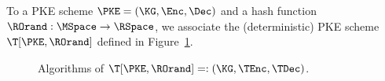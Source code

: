   	\begin{definition}[\T-transform]
  		To a PKE scheme $\PKE = (\KG, \Enc, \Dec)$ and a hash function $\ROrand:\MSpace \rightarrow \RSpace$,
  		we associate the (deterministic) PKE scheme $\T[\PKE, \ROrand]$ defined in Figure~\ref{fig:def:T-transform}.
  		
  		\begin{figure}[t]
  			\begin{center}
  			\end{center}
  			\caption{Algorithms of $\T[\PKE, \ROrand]=: (\KG, \TEnc, \TDec)$.}
  			\label{fig:def:T-transform}
  		\end{figure}
  		
  	\end{definition}
  
  	
  	
